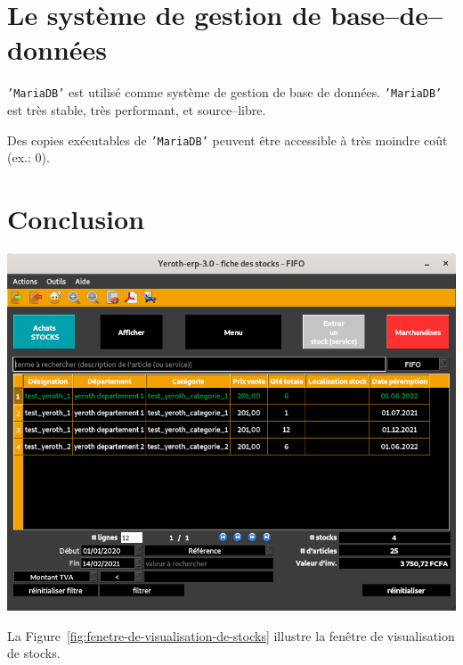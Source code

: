 \documentclass[a4paper, 10pt]{article}
\newcommand{\mariadb}{\texttt{'MariaDB'}\xspace}
\begin{document}
\begin{multicols}{2}
\vspace{-1.8em}
\section{Le syst\`eme de gestion de base--de--donn\'ees}
\vspace{-0.3em}
\mariadb est utilis\'e comme syst\`eme de gestion
de base de donn\'ees. \mariadb est tr\`es stable,
tr\`es performant, et source--libre.

Des copies ex\'ecutables de \mariadb peuvent \^etre
accessible \`a tr\`es moindre co\^ut (ex.: $0$).

\vspace{-2em}
\section{Conclusion}
\vspace{-1.3em}
\begin{center}
\includegraphics[scale=0.33]{images/yeroth-erp-3-0-fiche-stocks.png}
\label{fig:fenetre-de-visualisation-de-stocks}
\end{center}


La Figure~\ref{fig:fenetre-de-visualisation-de-stocks} illustre la
fen\^etre de visualisation de stocks.

\vspace{-0.5em}


\end{multicols}
\end{document}
